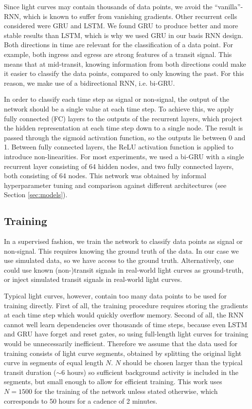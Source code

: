 Since light curves may contain thousands of data points, we avoid the ``vanilla''-RNN, which is known to suffer from vanishing gradients. Other recurrent cells considered were GRU and LSTM. We found GRU to produce better and more stable results than LSTM, which is why we used GRU in our basis RNN design. Both directions in time are relevant for the classification of a data point. For example, both ingress and egress are strong features of a transit signal. This means that at mid-transit, knowing information from both directions could make it easier to classify the data points, compared to only knowing the past. For this reason, we make use of a bidirectional RNN, i.e. bi-GRU.

In order to classify each time step as signal or non-signal, the output of the network should be a single value at each time step. To achieve this, we apply fully connected (FC) layers to the outputs of the recurrent layers, which project the hidden representation at each time step down to a single node. The result is passed through the sigmoid activation function, so the outputs lie between 0 and 1. Between fully connected layers, the ReLU activation function is applied to introduce non-linearities. For most experiments, we used a bi-GRU with a single recurrent layer consisting of 64 hidden nodes, and two fully connected layers, both consisting of 64 nodes. This network was obtained by informal hyperparameter tuning and comparison against different architectures (see Section \ref{sec:models}).

\subsection{Training}
\label{sec:training}

In a supervised fashion, we train the network to classify data points as signal or non-signal. This requires knowing the ground truth of the data. In our case we use simulated data, so we have access to the ground truth. Alternatively, one could use known (non-)transit signals in real-world light curves as ground-truth, or inject simulated transit signals in real-world light curves. 

Typical light curves, however, contain too many data points to be used for training directly. First of all, the training procedure requires storing the gradients at each time step which would quickly overflow memory. Second of all, the RNN cannot well learn dependencies over thousands of time steps, because even LSTM and GRU have forget and reset gates, so using full-length light curves for training would be unnecessarily inefficient. Therefore we assume that the data used for training consists of light curve segments, obtained by splitting the original light curve in segments of equal length $N$. $N$ should be chosen larger than the typical transit duration ($\sim$6 hours) so sufficient background activity is included in the segments, but small enough to allow for efficient training. This work uses $N=1500$ for the training of the network unless stated otherwise, which corresponds to 50 hours for a cadence of 2 minutes.

